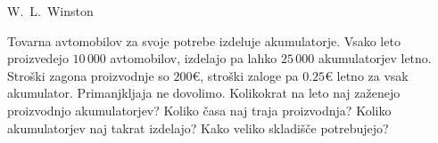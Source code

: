 \begin{naloga}{W.~L.~Winston}{\cite[\S15, Example~5]{w}}
\begin{vprasanje}
Tovarna avtomobilov za svoje potrebe izdeluje akumulatorje.
Vsako leto proizvedejo $10\,000$ avtomobilov,
izdelajo pa lahko $25\,000$ akumulatorjev letno.
Stroški zagona proizvodnje so $200 €$,
stroški zaloge pa $0.25 €$ letno za vsak akumulator.
Primanjkljaja ne dovolimo.
Kolikokrat na leto naj zaženejo proizvodnjo akumulatorjev?
Koliko časa naj traja proizvodnja?
Koliko akumulatorjev naj takrat izdelajo?
Kako veliko skladišče potrebujejo?
\end{vprasanje}
\begin{odgovor}
\end{odgovor}
\end{naloga}
